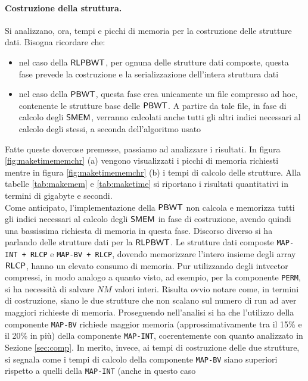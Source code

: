 \paragraph{Costruzione della struttura.}
Si analizzano, ora, tempi e picchi di memoria per la costruzione delle
strutture dati. Bisogna ricordare che:
\begin{itemize}
  \item nel caso della $\mbox{\rm {\sf RLPBWT}}$, per ognuna delle strutture dati
  composte, questa fase prevede la costruzione e la 
  serializzazione dell'intera struttura dati
  \item nel caso della $\mbox{\rm {\sf PBWT}}$, questa fase crea unicamente un file
  compresso ad hoc, contenente le strutture base delle $\mbox{\rm {\sf PBWT}}$. A partire
  da tale file, in fase di calcolo degli $\mbox{\rm {\sf SMEM}}$, verranno calcolati anche
  tutti gli altri indici necessari al calcolo degli stessi, a seconda
  dell'algoritmo usato 
\end{itemize}
Fatte queste doverose premesse, passiamo ad analizzare i risultati.
In figura \ref{fig:maketimememchr} (a) vengono visualizzati i picchi di
memoria richiesti mentre in figura \ref{fig:maketimememchr} (b) i tempi di
calcolo delle strutture. Alla tabelle \ref{tab:makemem} e \ref{tab:maketime} si
riportano i risultati quantitativi in termini di gigabyte e secondi.\\ 
Come anticipato, l'implementazione della $\mbox{\rm {\sf PBWT}}$ non calcola e memorizza
tutti gli indici 
necessari al calcolo degli $\mbox{\rm {\sf SMEM}}$ in fase di costruzione, avendo quindi
una bassissima richiesta di memoria in questa fase. Discorso diverso si ha
parlando delle strutture dati per la $\mbox{\rm {\sf RLPBWT}}$. Le strutture dati composte
\texttt{MAP-INT + RLCP} e \texttt{MAP-BV + RLCP}, dovendo 
memorizzare l'intero insieme degli array $\mbox{\rm {\sf RLCP}}$, hanno un elevato
consumo di memoria. Pur utilizzando degli intvector compressi, in modo
analogo a quanto visto, ad esempio, per la componente \texttt{PERM}, si ha
necessità di salvare $NM$ valori interi. Risulta ovvio notare come, in
termini di costruzione, siano le due strutture che non scalano sul numero
di run 
ad aver maggiori richieste di memoria. Proseguendo nell'analisi si ha che
l'utilizzo della componente 
\texttt{MAP-BV} richiede maggior memoria (approssimativamente tra
il 15\% e il 20\% in più) della componente
\texttt{MAP-INT}, coerentemente con quanto analizzato in Sezione
\ref{sec:comp}. In merito, invece, ai tempi di costruzione delle due 
strutture, si 
segnala come i tempi di calcolo della componente \texttt{MAP-BV} siano superiori
rispetto a quelli della \texttt{MAP-INT} (anche in questo caso

